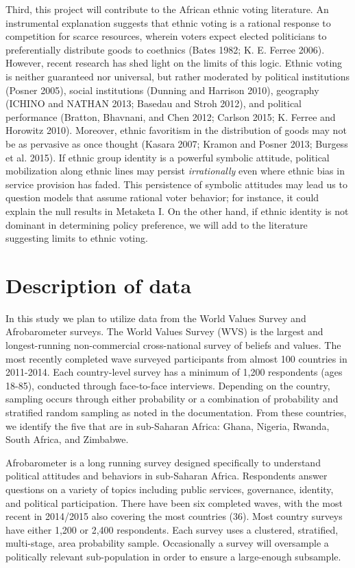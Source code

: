 \documentclass[]{article}
\begin{document}
Third, this project will contribute to the African ethnic voting
literature. An instrumental explanation suggests that ethnic voting is a
rational response to competition for scarce resources, wherein voters
expect elected politicians to preferentially distribute goods to
coethnics (Bates 1982; K. E. Ferree 2006). However, recent research has
shed light on the limits of this logic. Ethnic voting is neither
guaranteed nor universal, but rather moderated by political institutions
(Posner 2005), social institutions (Dunning and Harrison 2010),
geography (ICHINO and NATHAN 2013; Basedau and Stroh 2012), and
political performance (Bratton, Bhavnani, and Chen 2012; Carlson 2015;
K. Ferree and Horowitz 2010). Moreover, ethnic favoritism in the
distribution of goods may not be as pervasive as once thought (Kasara
2007; Kramon and Posner 2013; Burgess et al. 2015). If ethnic group
identity is a powerful symbolic attitude, political mobilization along
ethnic lines may persist \emph{irrationally} even where ethnic bias in
service provision has faded. This persistence of symbolic attitudes may
lead us to question models that assume rational voter behavior; for
instance, it could explain the null results in Metaketa I. On the other
hand, if ethnic identity is not dominant in determining policy
preference, we will add to the literature suggesting limits to ethnic
voting.

\section{Description of data}\label{description-of-data}

In this study we plan to utilize data from the World Values Survey and
Afrobarometer surveys. The World Values Survey (WVS) is the largest and
longest-running non-commercial cross-national survey of beliefs and
values. The most recently completed wave surveyed participants from
almost 100 countries in 2011-2014. Each country-level survey has a
minimum of 1,200 respondents (ages 18-85), conducted through
face-to-face interviews. Depending on the country, sampling occurs
through either probability or a combination of probability and
stratified random sampling as noted in the documentation. From these
countries, we identify the five that are in sub-Saharan Africa: Ghana,
Nigeria, Rwanda, South Africa, and Zimbabwe.

Afrobarometer is a long running survey designed specifically to
understand political attitudes and behaviors in sub-Saharan Africa.
Respondents answer questions on a variety of topics including public
services, governance, identity, and political participation. There have
been six completed waves, with the most recent in 2014/2015 also
covering the most countries (36). Most country surveys have either 1,200
or 2,400 respondents. Each survey uses a clustered, stratified,
multi-stage, area probability sample. Occasionally a survey will
oversample a politically relevant sub-population in order to ensure a
large-enough subsample.
\end{document}
